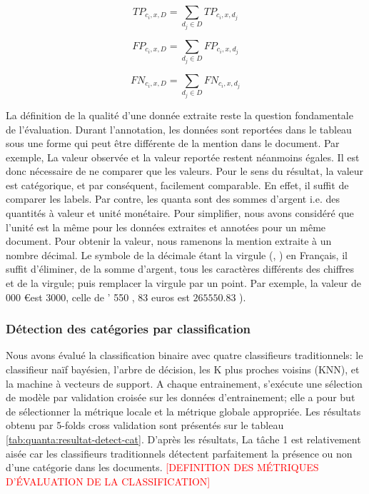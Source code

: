 \begin{equation}
TP_{c_i,x,D} = \sum\limits_{d_j \in D} TP_{c_i,x,d_j} \label{eq:quanta:tpdmd}
\end{equation}

\begin{equation}
FP_{c_i,x,D} = \sum\limits_{d_j \in D} FP_{c_i,x,d_j} \label{eq:quanta:fpdmd}
\end{equation}

\begin{equation}
FN_{c_i,x,D} = \sum\limits_{d_j \in D} FN_{c_i,x,d_j} \label{eq:quanta:fndmd}
\end{equation}


La définition de la qualité d'une donnée extraite reste la question fondamentale de l'évaluation. Durant l'annotation, les données sont reportées dans le tableau sous une forme qui peut être différente de la mention dans le document. Par exemple,  La valeur observée et la valeur reportée restent néanmoins égales. Il est donc nécessaire de ne comparer que les valeurs. Pour le sens du résultat, la valeur est catégorique, et par conséquent, facilement comparable. En effet, il suffit de comparer les labels. Par contre, les quanta sont des sommes d'argent i.e. des quantités à valeur et unité monétaire. Pour simplifier, nous avons considéré que l'unité est la même pour les données extraites et annotées pour un même document. Pour obtenir la valeur, nous ramenons la mention extraite à un nombre décimal. Le symbole de la décimale étant la virgule (\og , \fg) en Français, il suffit d'éliminer, de la somme d'argent, tous les caractères différents des chiffres et de la virgule; puis remplacer la virgule par un point. Par exemple, la valeur de  000 \euro \fg est $3000$, celle de  ' 550 , 83 euros \fg est $265550.83$ ).



\subsubsection{Détection des catégories par classification}

Nous avons évalué la classification binaire avec quatre classifieurs traditionnels: le classifieur naïf bayésien, l'arbre de décision, les K plus proches voisins (KNN), et la machine à vecteurs de support. A chaque entrainement, s'exécute une sélection de modèle par validation croisée sur les données d'entrainement; elle a pour but de sélectionner la métrique locale et la métrique globale appropriée. Les résultats obtenu par 5-folds cross validation sont présentés sur le tableau \ref{tab:quanta:resultat-detect-cat}.  D'après les résultats, La tâche 1 est relativement aisée car les classifieurs traditionnels détectent parfaitement la présence ou non d'une catégorie dans les documents. \textcolor{red}{[DEFINITION DES MÉTRIQUES D'ÉVALUATION DE LA CLASSIFICATION]}

